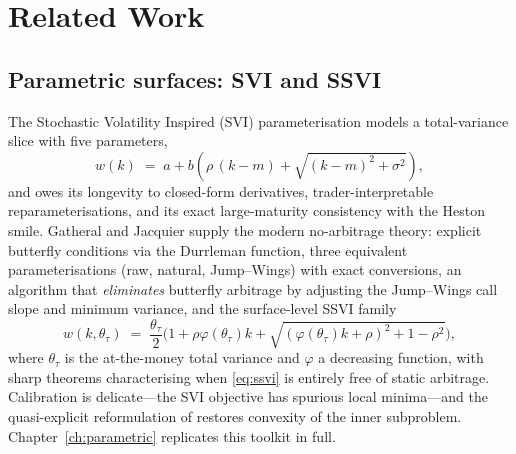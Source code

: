 \chapter{Related Work}\label{ch:literature}

\section{Parametric surfaces: SVI and SSVI}
The Stochastic Volatility Inspired (SVI) parameterisation \cite{gatheral2004parsimonious} models a total-variance slice with five parameters,
\begin{equation}\label{eq:sviraw}
  w(k) \;=\; a + b\left(\rho\,(k-m) + \sqrt{(k-m)^2+\sigma^2}\right),
\end{equation}
and owes its longevity to closed-form derivatives, trader-interpretable reparameterisations, and its exact large-maturity consistency with the Heston smile. Gatheral and Jacquier \cite{gatheral2014arbitrage} supply the modern no-arbitrage theory: explicit butterfly conditions via the Durrleman function, three equivalent parameterisations (raw, natural, Jump--Wings) with exact conversions, an algorithm that \emph{eliminates} butterfly arbitrage by adjusting the Jump--Wings call slope and minimum variance, and the surface-level SSVI family
\begin{equation}\label{eq:ssvi}
  w(k,\theta_\tau) \;=\; \frac{\theta_\tau}{2}\Big(1+\rho\varphi(\theta_\tau)k+\sqrt{(\varphi(\theta_\tau)k+\rho)^2+1-\rho^2}\Big),
\end{equation}
where $\theta_\tau$ is the at-the-money total variance and $\varphi$ a decreasing function, with sharp theorems characterising when \cref{eq:ssvi} is entirely free of static arbitrage. Calibration is delicate---the SVI objective has spurious local minima---and the quasi-explicit reformulation of \cite{zeliade2009quasi} restores convexity of the inner subproblem. Chapter~\ref{ch:parametric} replicates this toolkit in full.

